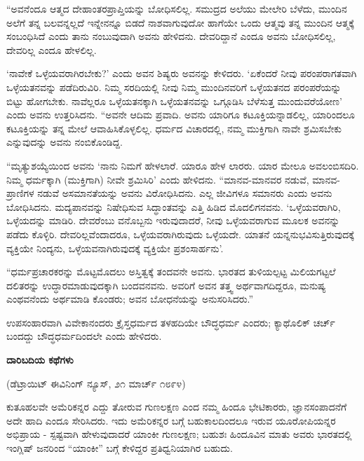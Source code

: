 “ಅವನೆಂದೂ ಆತ್ಮದ ದೇಹಾಂತರಪ್ರಾಪ್ತಿಯನ್ನು ಬೋಧಿಸಲಿಲ್ಲ. ಸಮುದ್ರದ ಅಲೆಯು ಮೇಲೇರಿ ಬೆಳೆದು, ಮುಂದಿನ ಅಲೆಗೆ ತನ್ನ ಬಲವನ್ನಲ್ಲದೆ ಇನ್ನೇನನ್ನೂ ಬಿಡದೆ ನಾಶವಾಗುವುದೋ ಹಾಗೆಯೇ ಒಂದು ಆತ್ಮವು ತನ್ನ ಮುಂದಿನ ಆತ್ಮಕ್ಕೆ ಸಂಬಂಧಿಸಿದೆ ಎಂದು ತಾನು ನಂಬುವುದಾಗಿ ಅವನು ಹೇಳಿದನು. ದೇವರಿದ್ದಾನೆ ಎಂದೂ ಅವನು ಬೋಧಿಸಲಿಲ್ಲ, ದೇವರಿಲ್ಲ ಎಂದೂ ಹೇಳಲಿಲ್ಲ.

‘ನಾವೇಕೆ ಒಳ್ಳೆಯವರಾಗಿರಬೇಕು?’ ಎಂದು ಅವನ ಶಿಷ್ಯರು ಅವನನ್ನು ಕೇಳಿದರು. ‘ಏಕೆಂದರೆ ನೀವು ಪರಂಪರಾಗತವಾಗಿ ಒಳ್ಳೆಯತನವನ್ನು ಪಡೆದಿರುವಿರಿ. ನಿಮ್ಮ ಸರದಿಯಲ್ಲಿ ನೀವು ನಿಮ್ಮ ಮುಂದಿನವರಿಗೆ ಒಳ್ಳೆಯತನದ ಪರಂಪರೆಯನ್ನು ಬಿಟ್ಟು ಹೋಗಬೇಕು. ನಾವೆಲ್ಲರೂ ಒಳ್ಳೆಯತನಕ್ಕಾಗಿ ಒಳ್ಳೆಯತನವನ್ನು ಒಗ್ಗೂಡಿಸಿ ಬೆಳೆಸುತ್ತ ಮುಂದುವರೆಯೋಣ’ ಎಂದು ಅವನು ಉತ್ತರಿಸಿದನು. “ಅವನೇ ಆದಿಮ ಪ್ರವಾದಿ. ಅವನು ಯಾರಿಗೂ ಕಟೂಕ್ತಿಯನ್ನಾಡಲಿಲ್ಲ, ಯಾರಿಂದಲೂ ಕಟೂಕ್ತಿಯನ್ನು ತನ್ನ ಮೇಲೆ ಆವಾಹಿಸಿಕೊಳ್ಳಲಿಲ್ಲ. ಧರ್ಮದ ವಿಚಾರದಲ್ಲಿ, ನಮ್ಮ ಮುಕ್ತಿಗಾಗಿ ನಾವೇ ಶ್ರಮಿಸಬೇಕು ಎನ್ನುವುದನ್ನು ಅವನು ನಂಬಿಕೊಂಡಿದ್ದ.

“ಮೃತ್ಯುಶಯ್ಯೆಯಿಂದ ಅವನು ‘ನಾನು ನಿಮಗೆ ಹೇಳಲಾರೆ. ಯಾರೂ ಹೇಳ ಲಾರರು. ಯಾರ ಮೇಲೂ ಅವಲಂಬಿಸದಿರಿ. ನಿಮ್ಮ ಧರ್ಮಕ್ಕಾಗಿ (ಮುಕ್ತಿಗಾಗಿ) ನೀವೇ ಶ್ರಮಿಸಿರಿ’ ಎಂದು ಹೇಳಿದನು. “ಮಾನವ-ಮಾನವರ ನಡುವೆ, ಮಾನವ-ಪ್ರಾಣಿಗಳ ನಡುವೆ ಅಸಮಾನತೆಯನ್ನು ಅವನು ವಿರೋಧಿಸಿದನು. ಎಲ್ಲ ಜೀವಿಗಳೂ ಸಮಾನರು ಎಂದು ಅವನು ಬೋಧಿಸಿದನು. ಮದ್ಯಪಾನವನ್ನು ನಿಷೇಧಿಸುವ ಸಿದ್ಧಾಂತವನ್ನು ಎತ್ತಿ ಹಿಡಿದ ಮೊದಲಿಗನವನು. ‘ಒಳ್ಳೆಯವರಾಗಿರಿ, ಒಳ್ಳೆಯದನ್ನು ಮಾಡಿರಿ. ದೇವರೆಂಬು ವನೊಬ್ಬನು ಇರುವುದಾದರೆ, ನೀವು ಒಳ್ಳೆಯವರಾಗುವ ಮೂಲಕ ಅವನನ್ನು ಪಡೆದು ಕೊಳ್ಳಿರಿ. ದೇವರಿಲ್ಲವೆಂದಾದರೂ, ಒಳ್ಳೆಯವರಾಗಿರುವುದು ಒಳ್ಳೆಯದೇ. ಯಾತನೆ ಯನ್ನನುಭವಿಸುತ್ತಿರುವುದಕ್ಕೆ ವ್ಯಕ್ತಿಯೇ ನಿಂದ್ಯನು, ಒಳ್ಳೆಯವನಾಗಿರುವುದಕ್ಕೆ ವ್ಯಕ್ತಿಯೇ ಪ್ರಶಂಸಾರ್ಹನು’.

“ಧರ್ಮಪ್ರಚಾರಕರನ್ನು ಮೊಟ್ಟಮೊದಲು ಅಸ್ತಿತ್ವಕ್ಕೆ ತಂದವನೇ ಅವನು. ಭಾರತದ ತುಳಿಯಲ್ಪಟ್ಟ ಮಿಲಿಯಗಟ್ಟಲೆ ದಲಿತರನ್ನು ಉದ್ಧಾರಮಾಡುವುದಕ್ಕಾಗಿ ಬಂದವನವನು. ಅವರಿಗೆ ಅವನ ತತ್ತ್ವ ಅರ್ಥವಾಗದಿದ್ದರೂ, ಮನುಷ್ಯ ಎಂಥವನೆಂದು ಅರ್ಥಮಾಡಿ ಕೊಂಡರು; ಅವನ ಬೋಧನೆಯನ್ನು ಅನುಸರಿಸಿದರು.”

ಉಪಸಂಹಾರವಾಗಿ ವಿವೇಕಾನಂದರು ಕ್ರೈಸ್ತಧರ್ಮದ ತಳಹದಿಯೇ ಬೌದ್ಧಧರ್ಮ ಎಂದರು; ಕ್ಯಾಥೊಲಿಕ್ ಚರ್ಚ್ ಬಂದದ್ದು ಬೌದ್ಧಧರ್ಮದಿಂದಲೇ ಎಂದು ಹೇಳಿದರು.

\begin{center}
\textbf{ದಾರಿಬದಿಯ ಕಥೆಗಳು}
\end{center}

\begin{center}
(ಡೆಟ್ರಾಯಿಟ್ ಈವಿನಿಂಗ್ ನ್ಯೂಸ್, ೨೧ ಮಾರ್ಚ್ ೧೮೯೪)
\end{center}

ಕುತೂಹಲವೇ ಅಮೆರಿಕನ್ನರ ಎದ್ದು ತೋರುವ ಗುಣಲಕ್ಷಣ ಎಂದ ನಮ್ಮ ಹಿಂದೂ ಭೇಟಿಕಾರರು, ಜ್ಞಾನಸಂಪಾದನೆಗೆ ಅದೇ ಹಾದಿ ಎಂದೂ ಸೇರಿಸಿದರು. ಇದು ಅಮೆರಿಕನ್ನರ ಬಗ್ಗೆ ಬಹುಕಾಲದಿಂದಲೂ ಇರುವ ಯೂರೋಪಿಯನ್ನರ ಅಭಿಪ್ರಾಯ - ಸ್ಪಷ್ಟವಾಗಿ ಹೇಳುವುದಾದರೆ ಯಾಂಕೀ ಗುಣಲಕ್ಷಣ; ಬಹುಶಃ ಹಿಂದೂವಿನ ಮಾತು ಅವರು ಭಾರತದಲ್ಲಿ ಇಂಗ್ಲಿಷ್ ಜನರಿಂದ “ಯಾಂಕೀ” ಬಗ್ಗೆ ಕೇಳಿದ್ದರ ಪ್ರತಿಧ್ವನಿಯಾಗಿರ ಬಹುದು.

